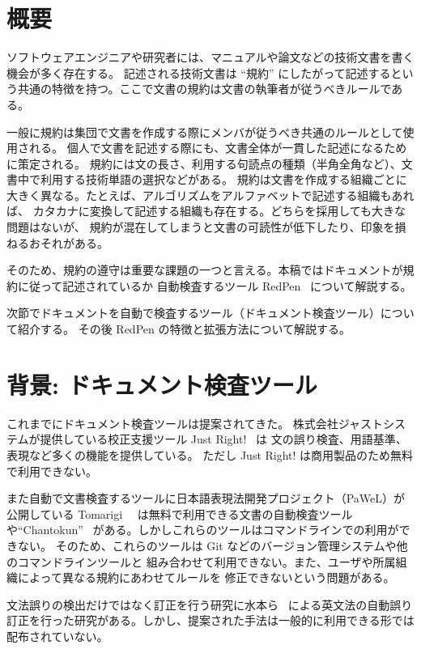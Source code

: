 \section{概要}

ソフトウェアエンジニアや研究者には、マニュアルや論文などの技術文書を書く機会が多く存在する。
記述される技術文書は ``規約'' にしたがって記述するという共通の特徴を持つ。ここで文書の規約は文書の執筆者が従うべきルールである。

一般に規約は集団で文書を作成する際にメンバが従うべき共通のルールとして使用される。
個人で文書を記述する際にも、文書全体が一貫した記述になるために策定される。
規約には文の長さ、利用する句読点の種類（半角全角など）、文書中で利用する技術単語の選択などがある。
規約は文書を作成する組織ごとに大きく異なる。たとえば、アルゴリズムをアルファベットで記述する組織もあれば、
カタカナに変換して記述する組織も存在する。どちらを採用しても大きな問題はないが、
規約が混在してしまうと文書の可読性が低下したり、印象を損ねるおそれがある。

そのため、規約の遵守は重要な課題の一つと言える。本稿ではドキュメントが規約に従って記述されているか
自動検査するツール RedPen~\cite{redpen}\cite{ito15repden} について解説する。

次節でドキュメントを自動で検査するツール（ドキュメント検査ツール）について紹介する。
その後 RedPen の特徴と拡張方法について解説する。

\section{背景: ドキュメント検査ツール}
これまでにドキュメント検査ツールは提案されてきた。
株式会社ジャストシステムが提供している校正支援ツール Just Right!~\cite{justright} は
文の誤り検査、用語基準、表現など多くの機能を提供している。
ただし Just Right! は商用製品のため無料で利用できない。

また自動で文書検査するツールに日本語表現法開発プロジェクト（PaWeL）が公開している
 Tomarigi~\cite{tomarigi}~\cite{tomarigi-paper} は無料で利用できる文書の自動検査ツール
や``Chantokun''~\cite{chantokun} がある。しかしこれらのツールはコマンドラインでの利用ができない。
そのため、これらのツールは Git などのバージョン管理システムや他のコマンドラインツールと
組み合わせて利用できない。また、ユーザや所属組織によって異なる規約にあわせてルールを
修正できないという問題がある。

文法誤りの検出だけではなく訂正を行う研究に水本ら~\cite{mizumoto12english} による英文法の自動誤り
訂正を行った研究がある。しかし、提案された手法は一般的に利用できる形では配布されていない。

